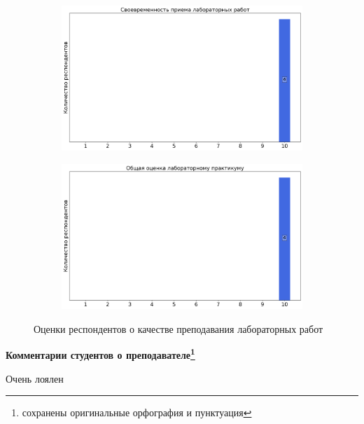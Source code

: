\begin{figure}[H]
\begin{subfigure}[b]{0.45\textwidth}
                    \centering
                    \includegraphics[width=\textwidth]{images/3 course/Общая физика - квантовая физика/labniks-marks-Юрьев Ю.В.-2.png}
                \end{subfigure}
                \begin{subfigure}[b]{0.45\textwidth}
                    \centering
                    \includegraphics[width=\textwidth]{images/3 course/Общая физика - квантовая физика/labniks-marks-Юрьев Ю.В.-3.png}
                \end{subfigure}	
                \caption{Оценки респондентов о качестве преподавания лабораторных работ}
            \end{figure}

            \textbf{Комментарии студентов о преподавателе\protect\footnote{сохранены оригинальные орфография и пунктуация}}
                \begin{commentbox} 
                    Очень лоялен 
                \end{commentbox} 
            

